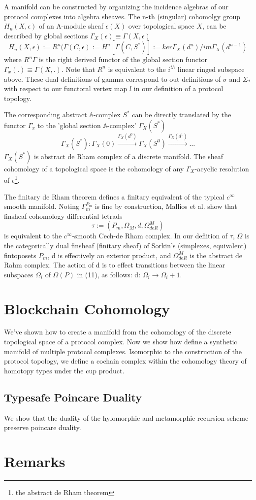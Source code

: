\documentclass{article}
\begin{document}
A manifold can be constructed by organizing the incidence algebras of our protocol complexes into algebra sheaves. The n-th (singular) cohomolgy group $H_n(X, \epsilon)$ of an A-module sheaf $\epsilon(X)$ over topological space $X$, can be described by global sections $\Gamma_X(\epsilon) \equiv \Gamma (X, \epsilon)$
\begin{equation} \label{eq1}
H_n(X, \epsilon) := R^n(\Gamma(C,\epsilon) := H^n[\Gamma(C, S^*)] := ker\Gamma_X(d^n)/im\Gamma_X(d^{n-1})
\end{equation} \label{eq1}
where $R^n\Gamma$ is the right derived functor of the global section functor $\Gamma_x(.) \equiv \Gamma(X,.)$. Note that $R^n$ is equivalent to the $i^{th}$ linear ringed subspace above. These dual definitions of gamma correspond to out definitions of $\sigma$ and $\Sigma_*$ with respect to our functoral vertex map $l$ in our definition of a protocol topology.

The corresponding abstract $\mathbb{A}$-complex $S^*$ can be directly translated by the functor $\Gamma_x$ to the 'global section $\mathbb{A}$-complex' $\Gamma_X(S^*)$
\begin{equation} \label{eq1}
\Gamma_X(S^*): \Gamma_X(0) \xrightarrow{\Gamma_X(d^0)} \Gamma_X(S^0) \xrightarrow{\Gamma_X(d^1)}\dots
\end{equation} \label{eq1}
$\Gamma_X(S^*)$ is abstract de Rham complex of a discrete manifold. The sheaf cohomology of a topological space is the cohomology of any $\Gamma_X$-acyclic resolution of $\epsilon$\footnote{the abstract de Rham theorem}.

The finitary de Rham theorem defines a finitary equivalent of the typical $c^{\infty}$ smooth manifold. Noting $\Gamma^{P_m}_m$ is fine by construction, Mallios et al. show that finsheaf-cohomology differential tetrads
\begin{equation} \label{eq1}
\tau := (P_m, \Omega_M, d, \Omega^M_{deR})
\end{equation} \label{eq1}
is equivalent to the $c^{\infty}$-smooth Cech-de Rham complex. In our defiition of $\tau$, $\Omega$ is the categorically dual finsheaf (finitary sheaf) of Sorkin's (simplexes, equivalent) fintoposets $P_m$, d is effectively an exterior product, and $ \Omega^M_{deR}$ is the abstract de Rahm complex. The action of d is to effect transitions between the linear subspaces $\Omega_i$ of $\Omega(P)$ in (11), as follows: d: $\Omega_i \rightarrow \Omega_i+1$.

\section{Blockchain Cohomology}
We've shown how to create a manifold from the cohomology of the discrete topological space of a protocol complex. Now we show how define a synthetic manifold of multiple protocol complexes. Isomorphic to the construction of the protocol topology, we define a cochain complex within the cohomology theory of homotopy types under the cup product.

\subsection{Typesafe Poincare Duality}
We show that the duality of the hylomorphic and metamorphic recursion scheme preserve poincare duality.

\section{Remarks}


\end{document}
